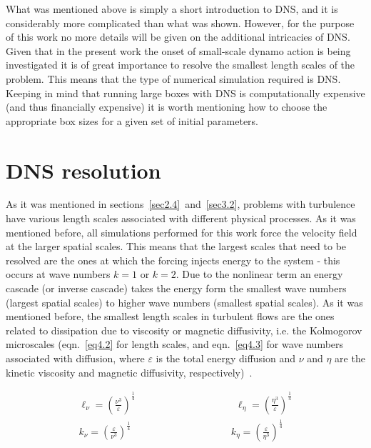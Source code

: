 \documentclass[12pt,a4paper]{report}
\begin{document}
What was mentioned above is simply a short introduction to DNS, and it is considerably more complicated than what was shown. However, for the purpose of this work no more details will be given on the additional intricacies of DNS. Given that in the present work the onset of small-scale dynamo action is being investigated it is of great importance to resolve the smallest length scales of the problem. This means that the type of numerical simulation required is DNS. Keeping in mind that running large boxes with DNS is computationally expensive (and thus financially expensive) it is worth mentioning how to choose the appropriate box sizes for a given set of initial parameters.

\section{DNS resolution}

As it was mentioned in sections~\ref{sec2.4}~and~\ref{sec3.2}, problems with turbulence have various length scales associated with different physical processes. As it was mentioned before, all simulations performed for this work force the velocity field at the larger spatial scales. This means that the largest scales that need to be resolved are the ones at which the forcing injects energy to the system - this occurs at wave numbers $k=1$ or $k=2$. Due to the nonlinear term an energy cascade (or inverse cascade) takes the energy form the smallest wave numbers (largest spatial scales) to higher wave numbers (smallest spatial scales). As it was mentioned before, the smallest length scales in turbulent flows are the ones related to dissipation due to viscosity or magnetic diffusivity, i.e. the Kolmogorov microscales (eqn.~\ref{eq4.2} for length scales, and eqn.~\ref{eq4.3} for wave numbers associated with diffusion, where $\varepsilon$ is the total energy diffusion and $\nu$ and $\eta$ are the kinetic viscosity and magnetic diffusivity, respectively)~\cite{yoffe2013investigation, LinkmannMoritzFrederikLeon2016Spim}.

\begin{align}
 \ell_\nu = \left( \frac{\nu^3}{\varepsilon} \right)^{\frac{1}{4}} \qquad \qquad \qquad \qquad \qquad \ell_\eta = \left( \frac{\eta^3}{\varepsilon} \right)^{\frac{1}{4}}
 \label{eq4.2}\\
 k_\nu = \left( \frac{\varepsilon}{\nu^3} \right)^{\frac{1}{4}} \qquad \qquad \qquad \qquad \qquad k_\eta = \left( \frac{\varepsilon}{\eta^3} \right)^{\frac{1}{4}} \label{eq4.3}
\end{align}
\end{document}
